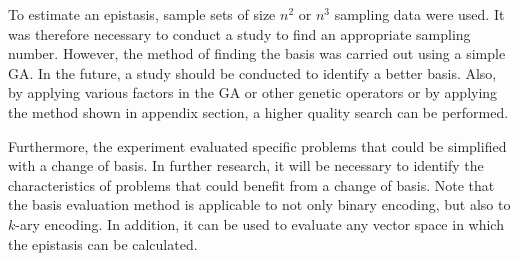 To estimate an epistasis, sample sets of size $ n^2 $ or $ n^3 $ sampling data were used. It was therefore necessary to conduct a study to find an appropriate sampling number. However, the method of finding the basis was carried out using a simple GA. In the future, a study should be conducted to identify a better basis. Also, by applying various factors in the GA or other genetic operators or by applying the method shown in appendix section, a higher quality search can be performed.

Furthermore, the experiment evaluated specific problems that could be simplified with a change of basis. In further research, it will be necessary to identify the characteristics of problems that could benefit from a change of basis. Note that the basis evaluation method is applicable to not only binary encoding, but also to $ k $-ary encoding. In addition, it can be used to evaluate any vector space in which the epistasis can be calculated.


